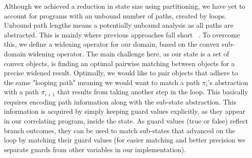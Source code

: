 Although we achieved a reduction in state size using partitioning, we have yet to account for programs with an unbound number of paths, created by loops. Unbound path lengths means a potentially unbound analysis as all paths are abstracted. This is mainly where previous approaches fall short ~\cite{GodlinStrichman09, KawaguchiLahiriRebelo10, DwyerElbaumPerson08, EnglerRamos11}. To overcome this, we define a widening operator for our domain, based on the convex sub-domain widening operator. The main challenge here, as our state is a set of convex objects, is finding an optimal pairwise matching between objects for a precise widened result. Optimally, we would like to pair objects that adhere to the same "looping path" meaning we would want to match a path $\pi_i$'s abstraction with a path $\pi_{i+1}$ that results from taking another step in the loop. This basically requires encoding path information along with the sub-state abstraction. This information is acquired by simply keeping guard values explicitly, as they appear in our correlating program, inside the state. As guard values (true or false) reflect branch outcomes, they can be used to match sub-states that advanced on the loop by matching their guard values (for easier matching and better precision we separate guards from other variables in our implementation).



